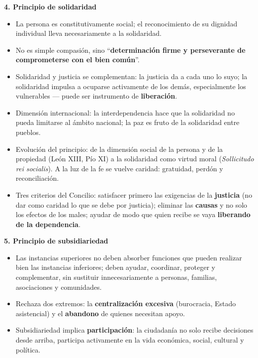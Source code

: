 \documentclass[10pt,a4paper]{article}
\begin{document}
\medskip\noindent \textbf{4. Principio de solidaridad}\par\nopagebreak
\begin{itemize}
\item La persona es constitutivamente social; el reconocimiento de su dignidad individual lleva necesariamente a la solidaridad.
\item No es simple compasión, sino ``\textbf{determinación firme y perseverante de comprometerse con el bien común}''.
\item Solidaridad y justicia se complementan: la justicia da a cada uno lo suyo; la solidaridad impulsa a ocuparse activamente de los demás, especialmente los vulnerables --- puede ser instrumento de \textbf{liberación}.
\item Dimensión internacional: la interdependencia hace que la solidaridad no pueda limitarse al ámbito nacional; la paz es fruto de la solidaridad entre pueblos.
\item Evolución del principio: de la dimensión social de la persona y de la propiedad (León XIII, Pío XI) a la solidaridad como virtud moral (\textit{Sollicitudo rei socialis}). A la luz de la fe se vuelve caridad: gratuidad, perdón y reconciliación.
\item Tres criterios del Concilio: satisfacer primero las exigencias de la \textbf{justicia} (no dar como caridad lo que se debe por justicia); eliminar las \textbf{causas} y no solo los efectos de los males; ayudar de modo que quien recibe se vaya \textbf{liberando de la dependencia}.
\end{itemize}

\medskip\noindent \textbf{5. Principio de subsidiariedad}\par\nopagebreak
\begin{itemize}
\item Las instancias superiores no deben absorber funciones que pueden realizar bien las instancias inferiores; deben ayudar, coordinar, proteger y complementar, sin sustituir innecesariamente a personas, familias, asociaciones y comunidades.
\item Rechaza dos extremos: la \textbf{centralización excesiva} (burocracia, Estado asistencial) y el \textbf{abandono} de quienes necesitan apoyo.
\item Subsidiariedad implica \textbf{participación}: la ciudadanía no solo recibe decisiones desde arriba, participa activamente en la vida económica, social, cultural y política.
\end{itemize}
\end{document}
